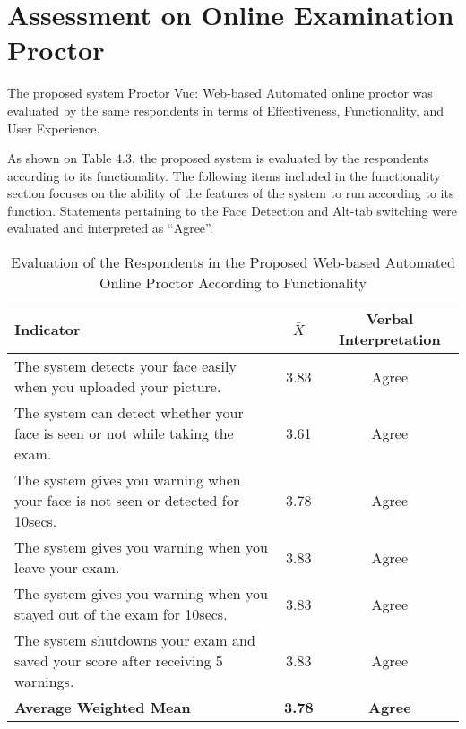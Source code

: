 \section{Assessment on Online Examination Proctor}

The proposed system Proctor Vue: Web-based Automated online proctor was evaluated by the same respondents in terms of Effectiveness, Functionality, and User Experience.

As shown on Table 4.3, the proposed system is evaluated by the respondents according to its functionality.
The following items included in the functionality section focuses on the ability of the features of the system to run according to its function.
Statements pertaining to the Face Detection and Alt-tab switching were evaluated and interpreted as “Agree”.

\pagebreak

\begin{table}[h!]
   \begin{center}
      \begin{tabular}{|m{20em}|c|c|}
         \hline
         \textbf{Indicator}                                                              & \textbf{$\bar{X}$} & \textbf{Verbal Interpretation} \\
         \hline
         The system detects your face easily when you uploaded your picture.             & 3.83               & Agree                          \\
         \hline
         The system can detect whether your face is seen or not while taking the exam.   & 3.61               & Agree                          \\
         \hline
         The system gives you warning when your face is not seen or detected for 10secs. & 3.78               & Agree                          \\
         \hline
         The system gives you warning when you leave your exam.                          & 3.83               & Agree                          \\
         \hline
         The system gives you warning when you stayed out of the exam for 10secs.        & 3.83               & Agree                          \\
         \hline
         The system shutdowns your exam and saved your score after receiving 5 warnings. & 3.83               & Agree                          \\
         \hline
         \textbf{Average Weighted Mean}                                                  & \textbf{3.78}      & \textbf{Agree}                 \\
         \hline
      \end{tabular}
   \end{center}
   \caption{Evaluation of the Respondents in the Proposed Web-based Automated Online Proctor According to Functionality}
\end{table}

